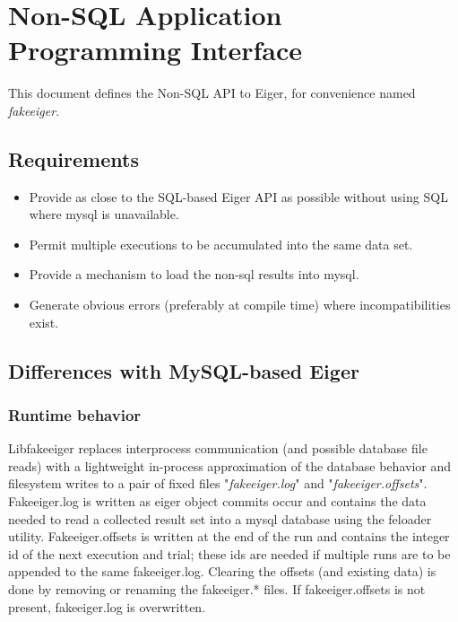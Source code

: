 \section{Non-SQL Application Programming Interface}
\label{sec:fakeapi}
This document defines the Non-SQL API to Eiger, for convenience named {\em fakeeiger}.

\subsection{Requirements}

\begin{itemize}
\item Provide as close to the SQL-based Eiger API as possible without using SQL where mysql is unavailable.

\item Permit multiple executions to be accumulated into the same data set.

\item Provide a mechanism to load the non-sql results into mysql.
 
\item Generate obvious errors (preferably at compile time) where incompatibilities exist.

\end{itemize}

\subsection{Differences with MySQL-based Eiger}

\subsubsection {Runtime behavior} 
Libfakeeiger replaces interprocess communication (and possible database file reads)  with a lightweight in-process approximation of the database behavior and filesystem writes to a pair of fixed files "{\em fakeeiger.log}" and "{\em fakeeiger.offsets}". Fakeeiger.log is written as eiger object commits occur and contains the data needed to read a collected result set into a mysql database using the feloader utility. Fakeeiger.offsets is written at the end of the run and contains the integer id of the next execution and trial; these ids are needed if multiple runs are to be appended to the same fakeeiger.log. Clearing the offsets (and existing data) is done by removing or renaming the fakeeiger.* files. If fakeeiger.offsets is not present, fakeeiger.log is overwritten. 

